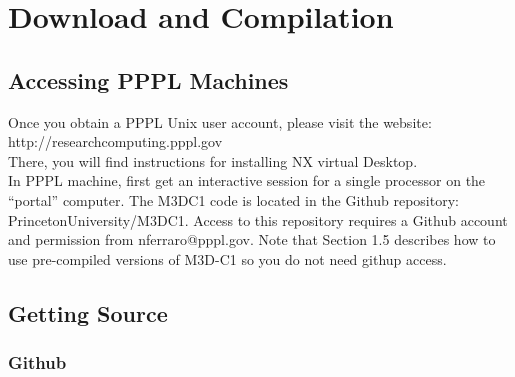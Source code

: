 \chapter{Download and Compilation}

\section{Accessing PPPL Machines}

Once you obtain a PPPL Unix user account, please visit the website:   http://researchcomputing.pppl.gov
\\
There, you will find instructions for installing NX virtual Desktop.
\\
In PPPL machine, first get an interactive session for a single processor on the “portal” computer.    The M3DC1 code is located in the Github repository: PrincetonUniversity/M3DC1. Access to this repository requires a Github account and permission from nferraro@pppl.gov.   Note that Section 1.5 describes how to use pre-compiled versions of M3D-C1 so you do not need githup access.

\section{Getting Source}
\subsection{Github}

